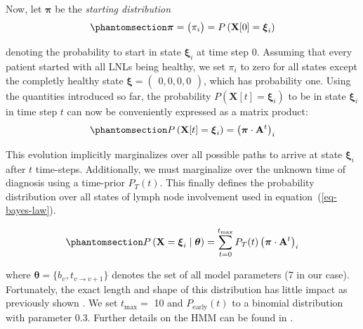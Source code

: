 \documentclass[11pt,twocolumn,twoside]{article}
\begin{document}
Now, let \(\boldsymbol{\pi}\) be the \emph{starting distribution}
\begin{equation}\phantomsection\label{eq-starting-distribution}{
\boldsymbol{\pi} = \begin{pmatrix} \pi_i \end{pmatrix} = P \left( \mathbf{X}[0] = \boldsymbol{\xi}_i \right)
}\end{equation}

denoting the probability to start in state \(\boldsymbol{\xi}_i\) at
time step 0. Assuming that every patient started with all
LNLs being healthy, we set \(\pi_i\) to zero for all states except the
completly healthy state
\(\boldsymbol{\xi} = \begin{pmatrix} 0, 0, 0, 0 \end{pmatrix}\), which
has probability one.
Using the quantities introduced so far, the probability
\(P \left( \mathbf{X}[t]=\boldsymbol{\xi}_i \right)\) to be in state
\(\boldsymbol{\xi}_i\) in time step \(t\) can now be conveniently expressed as a matrix product:
\begin{equation}\phantomsection\label{eq-evolution}{
P \left( \mathbf{X}[t]=\boldsymbol{\xi}_i \right) = \left( \boldsymbol{\pi} \cdot \mathbf{A}^t \right)_i
}\end{equation}

This evolution implicitly marginalizes over all possible paths to arrive
at state \(\boldsymbol{\xi}_i\) after \(t\) time-steps. Additionally, we
must marginalize over the unknown time of diagnosis using a time-prior
\(P_T(t)\). This finally defines the probability distribution over all
states of lymph node involvement used in equation~(\ref{eq-bayes-law}).

\begin{equation}\phantomsection\label{eq-marginalized-evolution}{
P \left( \mathbf{X}=\boldsymbol{\xi}_i \mid \boldsymbol{\theta} \right) = \sum_{t=0}^{t_\text{max}} P_T(t) \left( \boldsymbol{\pi} \cdot \mathbf{A}^t \right)_i
}\end{equation}

where \(\boldsymbol{\theta}=\{ b_v, t_{v \rightarrow v+1} \}\) denotes the
set of all model parameters (7 in our case). Fortunately, the exact
length and shape of this distribution has little impact as
previously shown \autocite{ludwig_hidden_2021}. We set \(t_\text{max}=\) 10 and \(P_\text{early}(t)\)
to a binomial distribution with parameter 0.3. Further details on the
HMM can be found in \autocite{ludwig_hidden_2021}.
\end{document}
